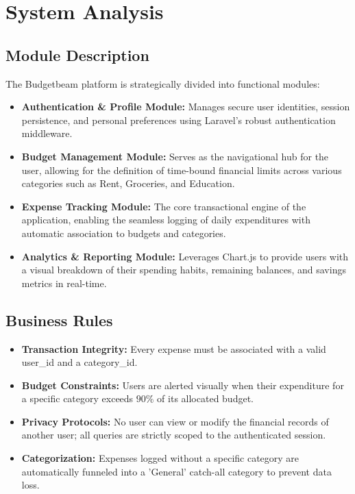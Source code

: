 \chapter{System Analysis}
\section{Module Description}
The Budgetbeam platform is strategically divided into functional modules:
\begin{itemize}
    \item \textbf{Authentication \& Profile Module:} Manages secure user identities, session persistence, and personal preferences using Laravel's robust authentication middleware.
    \item \textbf{Budget Management Module:} Serves as the navigational hub for the user, allowing for the definition of time-bound financial limits across various categories such as Rent, Groceries, and Education.
    \item \textbf{Expense Tracking Module:} The core transactional engine of the application, enabling the seamless logging of daily expenditures with automatic association to budgets and categories.
    \item \textbf{Analytics \& Reporting Module:} Leverages Chart.js to provide users with a visual breakdown of their spending habits, remaining balances, and savings metrics in real-time.
\end{itemize}

\section{Business Rules}
\begin{itemize}
    \item \textbf{Transaction Integrity:} Every expense must be associated with a valid user\_id and a category\_id.
    \item \textbf{Budget Constraints:} Users are alerted visually when their expenditure for a specific category exceeds $90\%$ of its allocated budget.
    \item \textbf{Privacy Protocols:} No user can view or modify the financial records of another user; all queries are strictly scoped to the authenticated session.
    \item \textbf{Categorization:} Expenses logged without a specific category are automatically funneled into a 'General' catch-all category to prevent data loss.
\end{itemize}

